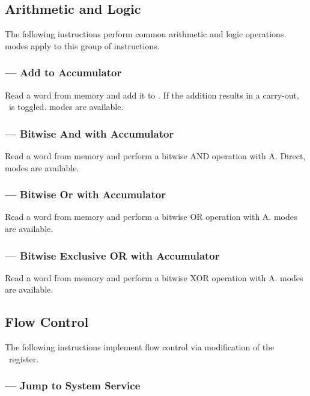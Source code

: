 \subsection{Arithmetic and Logic}

The following instructions perform common arithmetic and logic
operations. \AMGroupOne modes apply to this group of instructions.

\subsubsection{ — Add to Accumulator}
\label{sec:instruction-ADD}

Read a word from memory and add it to \A. If the addition results in a
carry-out, \Lreg\ is toggled. \AMGroupOne modes are available.

\subsubsection{ — Bitwise And with Accumulator}
\label{sec:instruction-AND}

Read a word from memory and perform a bitwise AND operation with A. Direct,
\AMGroupOne modes are available.

\subsubsection{ — Bitwise Or with Accumulator}
\label{sec:instruction-OR}

Read a word from memory and perform a bitwise OR operation with A. \AMGroupOne
modes are available.

\subsubsection{ — Bitwise Exclusive OR with Accumulator}
\label{sec:instruction-XOR}

Read a word from memory and perform a bitwise XOR operation with A. \AMGroupOne
modes are available.

\subsection{Flow Control}

The following instructions implement flow control via modification of the
\PC\ register.

\subsubsection{ — Jump to System Service}
\label{sec:instruction-TRAP}

